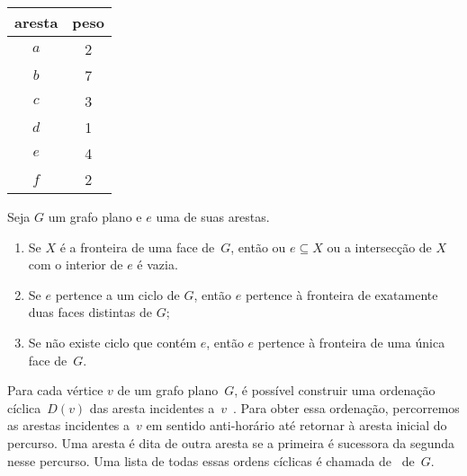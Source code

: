 \begin{minipage}[b]{0.4\textwidth}
\centering
\begin{tabular}{| c  c |} 
 \hline
 aresta & peso\\
 \hline
 $a$ & 2 \\ 
 \hline
$b$ & 7 \\
 \hline
$c$ & 3 \\
 \hline
$d$ & 1 \\
 \hline
$e$ & 4 \\
 \hline
$f$ & 2 \\
 \hline
\end{tabular}
\end{minipage}
\hfill
\begin{minipage}[b]{0.6\textwidth}
\scalebox{1.5}{
  \centering
  
  }
 \label{fig:MSF-basico-0}
\end{minipage}

\begin{lemma}
\label{lemma:diestel}
Seja $G$ um grafo plano e $e$ uma de suas arestas.
\begin{enumerate}
\item Se $X$ é a fronteira de uma face de~$G$, então ou $e\subseteq X$ ou a intersecção de $X$ com o interior de $e$ é vazia.
\item Se $e$ pertence a um ciclo de $G$, então $e$ pertence à fronteira de exatamente duas faces distintas de $G$;
\item Se não existe ciclo que contém $e$, então $e$ pertence à fronteira de uma única face de~$G$.
\end{enumerate}
\end{lemma}

Para cada vértice $v$ de um grafo plano~$G$, é possível construir uma ordenação cíclica~$D(v)$ das aresta incidentes a~$v$~\cite{noma2003}.
Para obter essa ordenação, percorremos as arestas incidentes a~$v$ em sentido anti-horário até retornar à aresta inicial do percurso.
Uma aresta é dita  de outra aresta se a primeira é sucessora da segunda nesse percurso.
Uma lista de todas essas ordens cíclicas é chamada de~ de~$G$.

